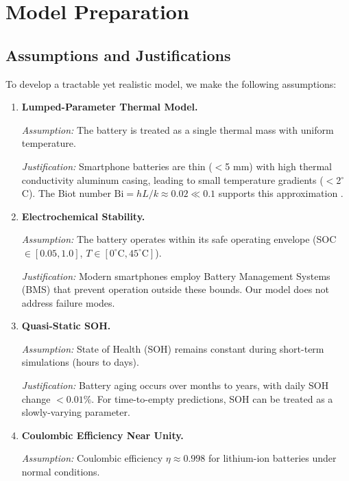 \section{Model Preparation}
\label{sec:assumptions}

\subsection{Assumptions and Justifications}
\label{subsec:assumptions}

To develop a tractable yet realistic model, we make the following assumptions:

\begin{enumerate}[label=\textbf{A\arabic*:}]
    \item \textbf{Lumped-Parameter Thermal Model.}
    
    \textit{Assumption:} The battery is treated as a single thermal mass with uniform temperature.
    
    \textit{Justification:} Smartphone batteries are thin ($<$5 mm) with high thermal conductivity aluminum casing, leading to small temperature gradients ($<$2$^\circ$C). The Biot number $\text{Bi} = hL/k \approx 0.02 \ll 0.1$ supports this approximation \cite{Bernardi1985}.
    
    \item \textbf{Electrochemical Stability.}
    
    \textit{Assumption:} The battery operates within its safe operating envelope (SOC $\in [0.05, 1.0]$, $T \in [0^\circ\text{C}, 45^\circ\text{C}]$).
    
    \textit{Justification:} Modern smartphones employ Battery Management Systems (BMS) that prevent operation outside these bounds. Our model does not address failure modes.
    
    \item \textbf{Quasi-Static SOH.}
    
    \textit{Assumption:} State of Health (SOH) remains constant during short-term simulations (hours to days).
    
    \textit{Justification:} Battery aging occurs over months to years, with daily SOH change $<0.01\%$. For time-to-empty predictions, SOH can be treated as a slowly-varying parameter.
    
    \item \textbf{Coulombic Efficiency Near Unity.}
    
    \textit{Assumption:} Coulombic efficiency $\eta \approx 0.998$ for lithium-ion batteries under normal conditions.
    

\end{enumerate}

